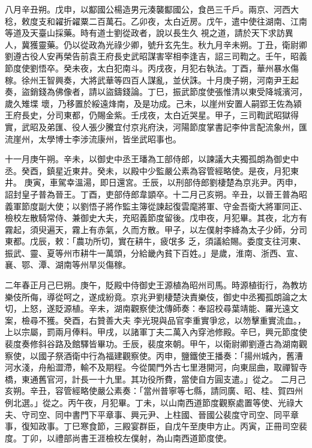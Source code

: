 \begin{pinyinscope}
 八月辛丑朔。戊申，以酅國公楊造男元湊襲酅國公，食邑三千戶。兩京、河西大稔，敕度支和糴折糴粟二百萬石。乙卯夜，太白近房。戊午，遣中使往湖南、江南等道及天臺山採藥。時有道士劉從政者，說以長生久
 視之道，請於天下求訪異人，冀獲靈藥。仍以從政為光祿少卿，號升玄先生。秋九月辛未朔。丁丑，衛尉卿劉遵古役人安再榮告前袁王府長史武昭謀害宰相李逢吉，詔三司鞫之。壬午，昭義節度使劉悟卒。癸未夜，太白犯南斗。丙戌夜，月犯右執法。丁酉，華州暴水傷稼。徐州王智興奏，大將武華等四百人謀亂，並伏誅。十月庚子朔，河南尹王起奏，盜銷錢為佛像者，請以盜鑄錢論。丁巳，振武節度使張惟清以東受降城濱河，歲久雉堞
 壞，乃移置於綏遠烽南，及是功成。己未，以崖州安置人嗣郢王佐為潁王府長史，分司東都，仍賜金紫。壬戌夜，太白近哭星。甲子，三司鞫武昭獄得實，武昭及弟匯、役人張少騰宜付京兆府決，河陽節度掌書記李仲言配流象州，匯流崖州，太學博士李涉流康州，皆坐武昭事也。



 十一月庚午朔。辛未，以御史中丞王璠為工部侍郎，以諫議大夫獨孤朗為御史中丞。癸酉，鎮星近東井。癸未，以殿中少監嚴公素為容管經略使。是夜，月犯東井。
 庚寅，車駕幸溫湯，即日還宮。壬辰，以刑部侍郎劉棲楚為京兆尹。丙申，詔封皇子普為晉王。丁酉，吏部侍郎韋顗卒。十二月己亥朔。辛丑，以晉王普為昭義軍節度副大使；以劉悟子將作監主簿從諫起復雲麾將軍、守金吾衛大將軍同正、檢校左散騎常侍、兼御史大夫，充昭義節度留後。戊申夜，月犯畢。其夜，北方有霧起，須臾遍天，霧上有赤氣，久而方散。甲子，以左僕射李絳為太子少師，分司東都。戊辰，敕：「農功所切，實在耕牛，疲氓多
 乏，須議給賜。委度支往河東、振武、靈、夏等州市耕牛一萬頭，分給畿內貧下百姓。」是歲，淮南、浙西、宣、襄、鄂、潭、湖南等州旱災傷稼。



 二年春正月己巳朔。庚午，貶殿中侍御史王源植為昭州司馬。時源植街行，為教坊樂伎所侮，導從呵之，遂成紛竟。京兆尹劉棲楚決責樂伎，御史中丞獨孤朗論之太切，上怒，遂貶源植。辛未，湖南觀察使沈傳師奏：奉詔校尋葉靖能、羅光遠文案，檢尋不獲。癸酉，右贊善大夫
 李光現與品官李重實爭忿，以笏擊重實流血。，上以宗屬，罰兩月俸料。甲戌，以諸軍丁夫二萬入內穿池修殿。辛巳，興元節度使裴度奏修斜谷路及館驛皆畢功。壬辰，裴度來朝。甲午，以衛尉卿劉遵古為湖南觀察使，以國子祭酒衛中行為福建觀察使。丙申，鹽鐵使王播奏：「揚州城內，舊漕河水淺，舟船澀滯，輸不及期程。今從閶門外古七里港開河，向東屈曲，取禪智寺橋，東通舊官河，計長一十九里。其功役所費，當使自方圓支遣。」從之。
 二月己亥朔。辛丑，容管經略使嚴公素奏：「當州普寧等七縣，請同廣、昭、桂、賀四州例北選。」從之。丙午夜，月犯畢。丁未，以山南西道節度觀察處置等使、光祿大夫、守司空、同中書門下平章事、興元尹、上柱國、晉國公裴度守司空、同平章事，復知政事。丁巳寒食節，三殿宴群臣，自戊午至庚申方止。丙寅，正冊司空裴度。丁卯，以禮部尚書王涯檢校左僕射，為山南西道節度使。




\end{pinyinscope}
